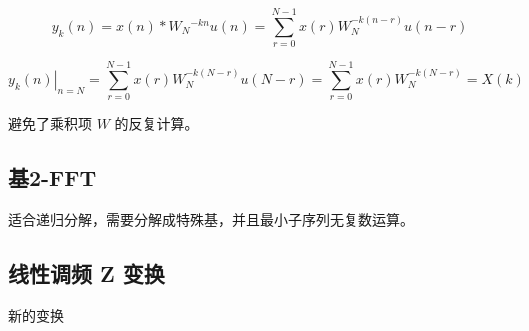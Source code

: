 \documentclass[cn,11pt,chinese,black,simple]{../elegantbook}
\begin{document}
\[y_{k}(n)=x(n) * W_{N}{ }^{-k n} u(n) = \sum_{r=0}^{N-1} x(r) W_{N}^{-k(n-r)} u(n-r)\]

\[\left.y_{k}(n)\right|_{n=N}=\sum_{r=0}^{N-1} x(r) W_{N}^{-k(N-r)} u(N-r)=\sum_{r=0}^{N-1} x(r) W_{N}^{-k(N-r)}=X(k)\]

避免了乘积项 \(W\) 的反复计算。

\subsection{基2-FFT}

适合递归分解，需要分解成特殊基，并且最小子序列无复数运算。

\subsection{线性调频 Z 变换}

新的变换


\let\chapname\undefined
\ifx\mainclass\undefined
\end{document}
